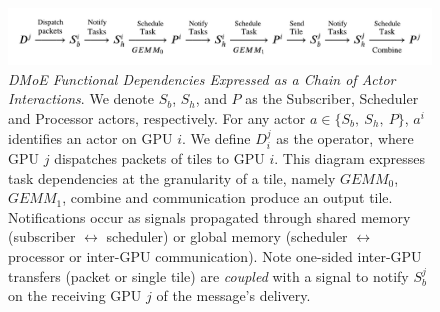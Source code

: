 \begin{figure}[!ht]
    \centering
    \includegraphics[width=\linewidth]{figures/actors}
    \caption{\emph{DMoE Functional Dependencies Expressed as a Chain of Actor Interactions}.
    We denote $S_b$, $S_h$, and $P$ as the
    Subscriber, Scheduler and Processor actors, respectively. For any actor $a \in \{S_b,\>S_h,\>P\}$,
        $a^i$ identifies an actor on GPU $i$. We define $D^j_i$ as the operator,
        where GPU $j$ dispatches packets of tiles to GPU $i$.
        This diagram expresses task dependencies at the granularity of a tile, namely
        $GEMM_0$, $GEMM_1$, combine and communication produce an output tile.
        Notifications occur as signals propagated through shared memory (subscriber $\leftrightarrow$ scheduler) or
        global memory (scheduler $\leftrightarrow$ processor or inter-GPU communication). Note one-sided
        inter-GPU transfers (packet or single tile) are \emph{coupled} with a signal to
        notify $S_b^j$ on the receiving GPU $j$ of the message's delivery.
    }
    \label{fig:actors}
    \vspace{-4mm}
\end{figure}

